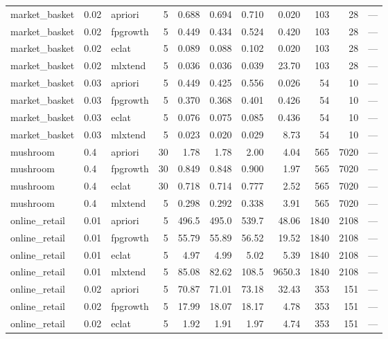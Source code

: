 \documentclass[journal,a4paper]{IEEEtran}
\begin{document}
\begin{longtable}{p{3.0cm}llrrrrrrrp{2.4cm}}
market\_\allowbreak{}basket & 0.02 & apriori & 5 & 0.688 & 0.694 & 0.710 & 0.020 & 103 & 28 & --- \\
market\_\allowbreak{}basket & 0.02 & fpgrowth & 5 & 0.449 & 0.434 & 0.524 & 0.420 & 103 & 28 & --- \\
market\_\allowbreak{}basket & 0.02 & eclat & 5 & 0.089 & 0.088 & 0.102 & 0.020 & 103 & 28 & --- \\
market\_\allowbreak{}basket & 0.02 & mlxtend & 5 & 0.036 & 0.036 & 0.039 & 23.70 & 103 & 28 & --- \\
market\_\allowbreak{}basket & 0.03 & apriori & 5 & 0.449 & 0.425 & 0.556 & 0.026 & 54 & 10 & --- \\
market\_\allowbreak{}basket & 0.03 & fpgrowth & 5 & 0.370 & 0.368 & 0.401 & 0.426 & 54 & 10 & --- \\
market\_\allowbreak{}basket & 0.03 & eclat & 5 & 0.076 & 0.075 & 0.085 & 0.436 & 54 & 10 & --- \\
market\_\allowbreak{}basket & 0.03 & mlxtend & 5 & 0.023 & 0.020 & 0.029 & 8.73 & 54 & 10 & --- \\
mushroom & 0.4 & apriori & 30 & 1.78 & 1.78 & 2.00 & 4.04 & 565 & 7020 & --- \\
mushroom & 0.4 & fpgrowth & 30 & 0.849 & 0.848 & 0.900 & 1.97 & 565 & 7020 & --- \\
mushroom & 0.4 & eclat & 30 & 0.718 & 0.714 & 0.777 & 2.52 & 565 & 7020 & --- \\
mushroom & 0.4 & mlxtend & 5 & 0.298 & 0.292 & 0.338 & 3.91 & 565 & 7020 & --- \\
online\_\allowbreak{}retail & 0.01 & apriori & 5 & 496.5 & 495.0 & 539.7 & 48.06 & 1840 & 2108 & --- \\
online\_\allowbreak{}retail & 0.01 & fpgrowth & 5 & 55.79 & 55.89 & 56.52 & 19.52 & 1840 & 2108 & --- \\
online\_\allowbreak{}retail & 0.01 & eclat & 5 & 4.97 & 4.99 & 5.02 & 5.39 & 1840 & 2108 & --- \\
online\_\allowbreak{}retail & 0.01 & mlxtend & 5 & 85.08 & 82.62 & 108.5 & 9650.3 & 1840 & 2108 & --- \\
online\_\allowbreak{}retail & 0.02 & apriori & 5 & 70.87 & 71.01 & 73.18 & 32.43 & 353 & 151 & --- \\
online\_\allowbreak{}retail & 0.02 & fpgrowth & 5 & 17.99 & 18.07 & 18.17 & 4.78 & 353 & 151 & --- \\
online\_\allowbreak{}retail & 0.02 & eclat & 5 & 1.92 & 1.91 & 1.97 & 4.74 & 353 & 151 & --- \\

\end{longtable}
\end{document}
